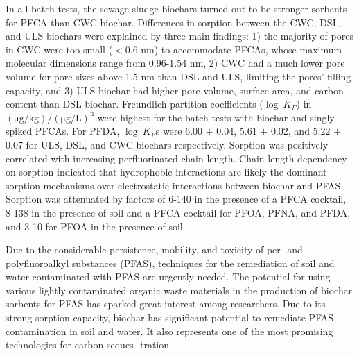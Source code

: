 In all batch tests, the sewage sludge biochars turned out to be stronger sorbents for PFCA than CWC biochar. Differences in sorption between the CWC, DSL, and ULS biochars were explained by three main findings: 1) the majority of pores in CWC were too small ($<$0.6 nm) to accommodate PFCAs, whose maximum molecular dimensions range from 0.96-1.54 nm, 2) CWC had a much lower pore volume for pore sizes above 1.5 nm than DSL and ULS, limiting the pores' filling capacity, and 3) ULS biochar had higher pore volume, surface area, and carbon-content than DSL biochar. Freundlich partition coefficients ($\log~K_F$) in $\mathrm{(\mu g/kg)/(\mu g/L)^n}$ were highest for the batch tests with biochar and singly spiked PFCAs. For PFDA, $\log~K_F$s were 6.00 $\pm$ 0.04, 5.61 $\pm$ 0.02, and 5.22 $\pm$ 0.07 for ULS, DSL, and CWC biochars respectively. Sorption was positively correlated with increasing perfluorinated chain length. Chain length dependency on sorption indicated that hydrophobic interactions are likely the dominant sorption mechanisms over electrostatic interactions between biochar and PFAS. Sorption was attenuated by factors of 6-140 in the presence of a PFCA cocktail, 8-138 in the presence of soil and a PFCA cocktail for PFOA, PFNA, and PFDA, and 3-10 for PFOA in the presence of soil. 

Due to the considerable persistence, mobility, and toxicity of per- and polyfluoroalkyl substances
(PFAS), techniques for the remediation of soil and water contaminated with PFAS are urgently
needed. The potential for using various lightly contaminated organic waste materials in the
production of biochar sorbents for PFAS has sparked great interest among researchers. Due to
its strong sorption capacity, biochar has significant potential to remediate PFAS-contamination
in soil and water. It also represents one of the most promising technologies for carbon seques-
tration